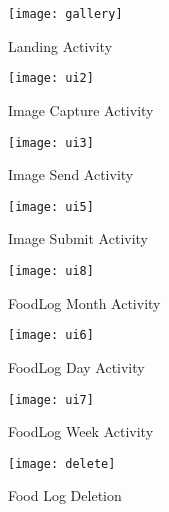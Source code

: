 \begin{figure}
  \label{uiDesign1} 
  \begin{minipage}[b]{0.5\linewidth}
    \centering
    \texttt{[image: gallery]} 
    \caption{Landing Activity} 
  \label{fig:gallery}
    \vspace{4ex}
  \end{minipage}%
  \begin{minipage}[b]{0.5\linewidth}
    \centering
    \texttt{[image: ui2]} 
    \caption{Image Capture Activity} 
  \label{fig:ui2}
    \vspace{4ex}
  \end{minipage} 
  \begin{minipage}[b]{0.5\linewidth}
    \centering
    \texttt{[image: ui3]} 
    \caption{Image Send Activity} 
    \label{fig:ui3}
    \vspace{4ex}
  \end{minipage}%
  \begin{minipage}[b]{0.5\linewidth}
    \centering
    \texttt{[image: ui5]} 
    \caption{Image Submit Activity} 
    \label{fig:ui5}
    \vspace{4ex}
  \end{minipage} 
\end{figure}

\begin{figure}
  \label{uiDesign2} 
  \begin{minipage}[b]{0.5\linewidth}
    \centering
    \texttt{[image: ui8]} 
    \caption{FoodLog Month Activity} 
    \label{fig:ui8}
    \vspace{4ex}
  \end{minipage}
  \begin{minipage}[b]{0.5\linewidth}
    \centering
    \texttt{[image: ui6]} 
    \caption{FoodLog Day Activity} 
  \label{fig:ui6}
    \vspace{4ex}
  \end{minipage} 
  \begin{minipage}[b]{0.5\linewidth}
    \centering
    \texttt{[image: ui7]} 
    \caption{FoodLog Week Activity} 
    \label{fig:ui7}
    \vspace{4ex}
  \end{minipage}%
  \begin{minipage}[b]{0.5\linewidth}
    \centering
    \texttt{[image: delete]} 
    \caption{Food Log Deletion} 
  \label{fig:delete}
    \vspace{4ex} 
    \end{minipage}%
\end{figure}
\clearpage

